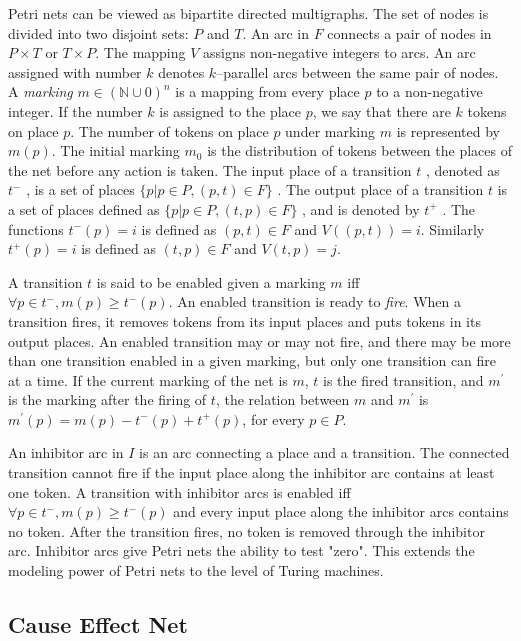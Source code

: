 Petri nets can be viewed as bipartite directed multigraphs. The set of nodes is divided into two disjoint sets: $P$ and $T$. An arc in $F$ connects a pair of nodes in $P \times T$ or $T \times P$. The mapping $V$ assigns non-negative integers to arcs. An arc assigned with number $k$ denotes $k$–parallel arcs between the same pair of nodes. A \emph{marking} $m \in (\mathbb{N} \cup 0)^n $ is a mapping from every place $p$ to a non-negative integer. If the number $k$ is assigned to the place $p$, we say that there are $k$ tokens on place $p$. The number of tokens on place $p$ under marking $m$ is represented by $m(p)$. The initial marking $m_0$ is the distribution of tokens between the places of the net before any action is taken. The input place of a transition $t$ , denoted as $t^−$ , is a set of places $\{ p | p \in P, (p, t) \in F \}$ . The output place of a transition $t$ is a set of places deﬁned as $\{ p | p \in P, (t, p) \in F \}$ , and is denoted by $t^+$ . The functions $t^−(p) = i$ is deﬁned as $(p, t) \in F$ and $V ((p, t)) = i$. Similarly $t^+(p) = i$ is deﬁned as $(t, p) \in F$ and $V(t, p) = j$.

A transition $t$ is said to be enabled given a marking $m$ iff $\forall p \in t^− , m(p) \geq t^− (p)$. An enabled transition is ready to \emph{ﬁre}. When a transition ﬁres, it removes tokens from its input places and puts tokens in its output places. An enabled transition may or may not ﬁre, and there may be more than one transition enabled in a given marking, but only one transition can ﬁre at a time. If the current marking of the net is $m$, $t$ is the ﬁred transition, and $m^\prime$ is the marking after the ﬁring of $t$, the relation between $m$ and $m^\prime$ is $m^\prime (p) = m(p) − t^− (p) + t^+ (p)$, for every $p \in P$.

An inhibitor arc in $I$ is an arc connecting a place and a transition. The connected transition cannot fire if the input place along the inhibitor arc contains at least one token. A transition with inhibitor arcs is enabled iff $\forall p \in t^− , m(p) \geq t^− (p)$ and every input place along the inhibitor arcs contains no token. After the transition ﬁres, no token is removed through the inhibitor arc. Inhibitor arcs give Petri nets the ability to test "zero". This extends the modeling power of Petri nets to the level of Turing machines.


\subsection{Cause Effect Net}

